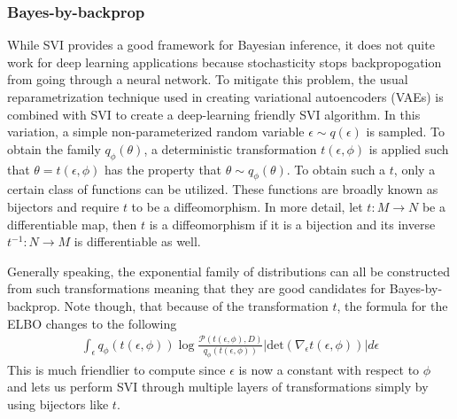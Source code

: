 \subsubsection{Bayes-by-backprop}
\label{sec:bayes-by-backprop}
While SVI provides a good framework for Bayesian inference, it does not quite work for deep learning applications because stochasticity stops backpropogation from going through a neural network. To mitigate this problem, the usual reparametrization technique used in creating variational autoencoders (VAEs) \cite{kingma_introduction_2019} is combined with SVI to create a deep-learning friendly SVI algorithm. In this variation, a simple non-parameterized random variable $\epsilon \sim q(\epsilon)$ is sampled. To obtain the family $q_{\phi}(\theta)$, a deterministic transformation $t(\epsilon, \phi)$ is applied such that $\theta = t(\epsilon, \phi)$ has the property that $\theta \sim q_{\phi}(\theta)$. To obtain such a $t$, only a certain class of functions can be utilized. These functions are broadly known as bijectors and require $t$ to be a diffeomorphism. In more detail, let $t : M \rightarrow N$ be a differentiable map, then $t$ is a diffeomorphism if it is a bijection and its inverse $t^{-1} : N \rightarrow M$ is differentiable as well. 

Generally speaking, the exponential family of distributions can all be constructed from such transformations meaning that they are good candidates for Bayes-by-backprop. Note though, that because of the transformation $t$, the formula for the ELBO changes to the following
\begin{align*}
  \int_{\epsilon} q_{\phi}(t(\epsilon, \phi)) \log \frac{\mathcal{P}(t(\epsilon, \phi), D)}{q_{\phi}(t(\epsilon, \phi))}|\text{det}(\nabla_{\epsilon} t(\epsilon, \phi))| d\epsilon
\end{align*}
This is much friendlier to compute since $\epsilon$ is now a constant with respect to $\phi$ and lets us perform SVI through multiple layers of transformations simply by using bijectors like $t$.

